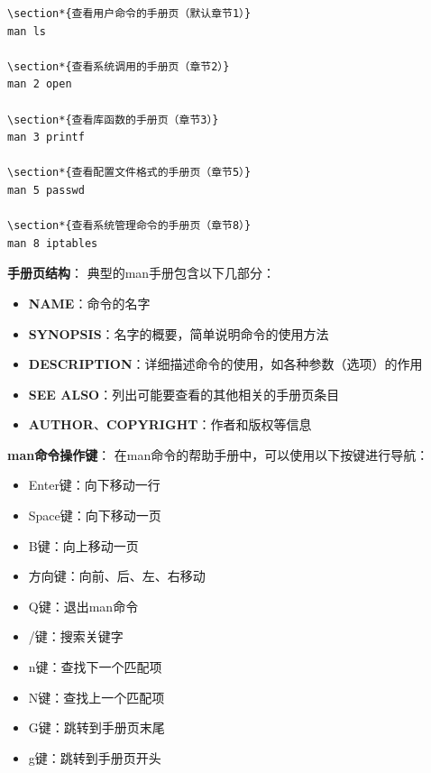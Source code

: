 \documentclass[12pt,UTF8]{ctexbook}
\begin{document}
\begin{verbatim}
\section*{查看用户命令的手册页（默认章节1）}
man ls

\section*{查看系统调用的手册页（章节2）}
man 2 open

\section*{查看库函数的手册页（章节3）}
man 3 printf

\section*{查看配置文件格式的手册页（章节5）}
man 5 passwd

\section*{查看系统管理命令的手册页（章节8）}
man 8 iptables
\end{verbatim}

\textbf{手册页结构}：
典型的man手册包含以下几部分：
\begin{itemize}
    \item \textbf{NAME}：命令的名字
    \item \textbf{SYNOPSIS}：名字的概要，简单说明命令的使用方法
    \item \textbf{DESCRIPTION}：详细描述命令的使用，如各种参数（选项）的作用
    \item \textbf{SEE ALSO}：列出可能要查看的其他相关的手册页条目
    \item \textbf{AUTHOR}、\textbf{COPYRIGHT}：作者和版权等信息
\end{itemize}

\textbf{man命令操作键}：
在man命令的帮助手册中，可以使用以下按键进行导航：
\begin{itemize}
    \item Enter键：向下移动一行
    \item Space键：向下移动一页
    \item B键：向上移动一页
    \item 方向键：向前、后、左、右移动
    \item Q键：退出man命令
    \item /键：搜索关键字
    \item n键：查找下一个匹配项
    \item N键：查找上一个匹配项
    \item G键：跳转到手册页末尾
    \item g键：跳转到手册页开头
\end{itemize}
\end{document}
